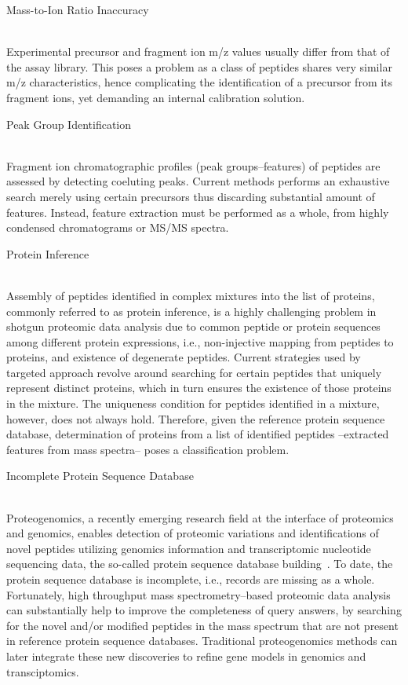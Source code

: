 \documentclass{nature}
\begin{document}
\begin{enumerate}
    {\bf \item Mass-to-Ion Ratio Inaccuracy}\\
    Experimental precursor and fragment ion m/z values usually differ from that of the assay library. This poses a problem as a class of peptides shares very similar m/z characteristics, hence complicating the identification of a precursor from its fragment ions, yet demanding an internal calibration solution.
    
    {\bf \item Peak Group Identification}\\
    Fragment ion chromatographic profiles (peak groups--features) of peptides are assessed by detecting coeluting peaks. Current methods performs an exhaustive search merely using certain precursors thus discarding substantial amount of features. Instead, feature extraction must be performed as a whole, from highly condensed chromatograms or MS/MS spectra.
   
    {\bf \item Protein Inference}\\
    Assembly of peptides identified in complex mixtures into the list of proteins, commonly referred to as protein inference, is a highly challenging problem in shotgun proteomic data analysis due to common peptide or protein sequences among different protein expressions, i.e., non-injective mapping from peptides to proteins, and existence of degenerate peptides. Current strategies used by targeted approach revolve around searching for certain peptides that uniquely represent distinct proteins, which in turn ensures the existence of those proteins in the mixture. The uniqueness condition for peptides identified in a mixture, however, does not always hold. Therefore, given the reference protein sequence database, determination of proteins from a list of identified peptides --extracted features from mass spectra-- poses a classification problem.
    
    {\bf \item  Incomplete Protein Sequence Database}\\
    Proteogenomics, a recently emerging research field at the interface of proteomics and genomics, enables detection of proteomic variations and identifications of novel peptides utilizing genomics information and transcriptomic nucleotide sequencing data, the so-called protein sequence database building~\cite{Nesvizhskii2014Proteogenomics}. To date, the protein sequence database is incomplete, i.e., records are missing as a whole. Fortunately, high throughput mass spectrometry--based proteomic data analysis can substantially help to improve the completeness of query answers, by searching for the novel and/or modified peptides in the mass spectrum that are not present in reference protein sequence databases. Traditional proteogenomics methods can later integrate these new discoveries to refine gene models in genomics and transciptomics.
    

\end{enumerate}
\end{document}
